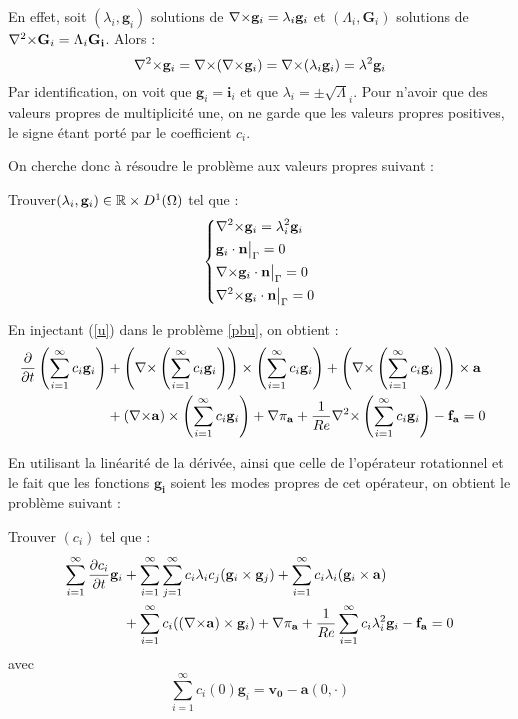En effet, soit $(\lambda_i,\mathbf{g}_i)$ solutions de ${\nabla\times} \mathbf{g}_i = \lambda_i\mathbf{g}_i$ et $(\Lambda_i,\mathbf{G}_i)$ solutions de ${\nabla^2\times} \mathbf{G}_i = \Lambda_i\mathbf{G_i}$. Alors :
\[ {\nabla^2\times} \mathbf{g}_i = {\nabla\times}({\nabla\times} \mathbf{g}_i)={\nabla\times}(\lambda_i\mathbf{g}_i)=\lambda^2\mathbf{g}_i \]
Par identification, on voit que $\mathbf{g}_i=\mathbf{i}_i$ et que $\lambda_i=\pm\sqrt\Lambda_i$. Pour n'avoir que des valeurs propres de multiplicité une, on ne garde que les valeurs propres positives, le signe étant porté par le coefficient $c_i$.

On cherche donc à résoudre le problème aux valeurs propres suivant :
\begin{pb}\label{curlcurl}
Trouver$(\lambda_i,\mathbf{g}_i)\in{\mathbb{R}}\times D^1(\Omega)$ tel que :
\begin{equation*}
\left\{\begin{aligned}
&{\nabla^2\times}  \mathbf{g}_i = \lambda_i^2 \mathbf{g}_i\\
&\mathbf{g}_i\cdot \mathbf{n}{\big\rvert_{\Gamma}} = 0\\
&{\nabla\times} \mathbf{g}_i\cdot \mathbf{n}{\big\rvert_{\Gamma}} = 0\\
&{\nabla^2\times}  \mathbf{g}_i\cdot \mathbf{n}{\big\rvert_{\Gamma}} = 0
\end{aligned}\right.
\end{equation*}\end{pb}

En injectant (\ref{u}) dans le problème \ref{pbu}, on obtient :
\begin{align*}
\frac{\partial}{\partial t}\left(\sum_{i=1}^\infty c_i\mathbf{g}_i\right) &+ \left({\nabla\times} \left(\sum_{i=1}^\infty c_i\mathbf{g}_i\right)\right)\times \left(\sum_{i=1}^\infty c_i\mathbf{g}_i\right) + \left({\nabla\times} \left(\sum_{i=1}^\infty c_i\mathbf{g}_i\right)\right)\times \mathbf{a}&\\
&+ ({\nabla\times} \mathbf{a})\times \left(\sum_{i=1}^\infty c_i\mathbf{g}_i\right) + {\nabla} \pi_{\mathbf{a}} +\frac{1}{Re}{\nabla^2\times}  \left(\sum_{i=1}^\infty c_i\mathbf{g}_i\right) - \mathbf{f_a} =0\\
\end{align*}

En utilisant la linéarité de la dérivée, ainsi que celle de l'opérateur rotationnel et le fait que les fonctions $\bm{g_i}$ soient les modes propres de cet opérateur, on obtient le problème suivant :
\begin{pb}\label{pbc}
Trouver $(c_i)$ tel que :
\begin{align*}
\sum_{i=1}^\infty\frac{\partial c_i}{\partial t}\mathbf{g}_i &+ \sum_{i=1}^\infty\sum_{j=1}^\infty c_i\lambda_ic_j(\mathbf{g}_i\times \mathbf{g}_j) + \sum_{i=1}^\infty c_i\lambda_i(\mathbf{g}_i\times \mathbf{a})\\
& + \sum_{i=1}^\infty c_i(({\nabla\times}\mathbf{a})\times \mathbf{g}_i) + {\nabla} \pi_{\mathbf{a}} +\frac{1}{Re}\sum_{i=1}^\infty c_i\lambda_i^2\mathbf{g}_i - \mathbf{f_a} = 0\\
\end{align*}
avec \[ \sum_{i=1}^\infty c_i(0)\mathbf{g}_i = \mathbf{v_0}-\mathbf{a}(0,\cdot) \]
\end{pb}

